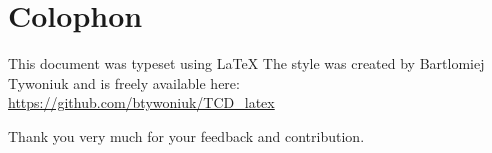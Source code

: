 
\pagestyle{empty}

\hfill

\vfill


\section*{Colophon}
This document was typeset using \LaTeX
The style was created by Bartlomiej Tywoniuk and is freely available here: \\
\url{https://github.com/btywoniuk/TCD_latex}

Thank you very much for your feedback and contribution.

\bigskip

\noindent

